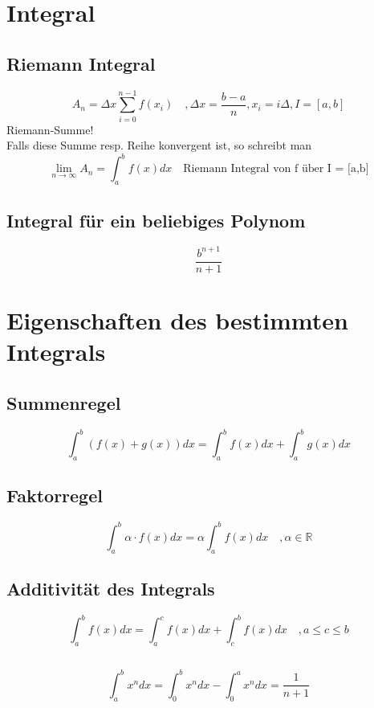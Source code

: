 \section{Integral}
\subsection{Riemann Integral}
\[ \boxed{A_n = \Delta x \sum_{i=0}^{n-1} f(x_i) \quad 
, \Delta x = \frac{b - a}{n} , x_i = i \Delta , I = [a,b]} \]
Riemann-Summe! \\
Falls diese Summe resp. Reihe konvergent ist, so schreibt man
\[ \boxed{\lim_{n \rightarrow \infty} A_n = \int_{a}^{b} f(x) d x \quad \text{Riemann Integral von f über I = [a,b]} } \]

\subsection{Integral für ein beliebiges Polynom}
\[ \boxed{\frac{b^{n + 1}}{n + 1}} \]

\section{Eigenschaften des bestimmten Integrals}
\subsection{Summenregel}
\[ \boxed{\int_a^b (f(x) + g(x)) dx = \int_a^b f(x) dx + \int_a^b g(x) dx} \]
\subsection{Faktorregel}
\[ \boxed{\int_a^b \alpha \cdot f(x) dx = \alpha \int_a^b f(x) dx \quad , \alpha \in \mathbb{R}} \]
\subsection{Additivität des Integrals}
\[ \boxed{\int_a^b f(x) dx = \int_a^c f(x) dx + \int_c^b f(x) dx \quad , a \leq c \leq b} \]
\subsection{}
\[ \boxed{\int_a^b x^n dx = \int_0^b x^n dx - \int_0^a x^n dx = \frac{1}{n + 1}} \]